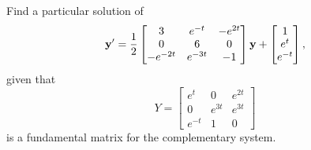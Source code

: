 \documentclass{ximera}
\begin{document}
\begin{example}\label{example:10.7.5}
Find a particular solution of
\begin{equation} \label{eq:10.7.10}
{\bf y}'=\frac{1}{2}
\begin{bmatrix}3&e^{-t}&-e^{2t}\\0&6&0\\-e^{-2t}&e^{-3t}&-1\end{bmatrix}
{\bf y}+\begin{bmatrix}1\\e^t\\e^{-t}\end{bmatrix},
\end{equation}
given that
$$
Y=\begin{bmatrix}e^t&0&e^{2t}\\0&e^{3t}&e^{3t}\\e^{-t}&1&0
\end{bmatrix}
$$
is a fundamental matrix for the complementary system.



\end{example}
\end{document}
